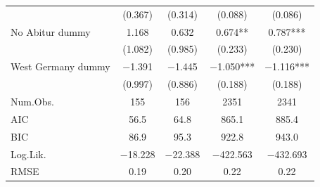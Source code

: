 \documentclass[
]{article}
\begin{document}
\begin{table}[!h]
\begin{tabular}[t]{lcccc}
 & (\num{0.367}) & (\num{0.314}) & (\num{0.088}) & (\num{0.086})\\
No Abitur dummy & \num{1.168} & \num{0.632} & \num{0.674}** & \num{0.787}***\\
 & (\num{1.082}) & (\num{0.985}) & (\num{0.233}) & (\num{0.230})\\
West Germany dummy & \num{-1.391} & \num{-1.445} & \num{-1.050}*** & \num{-1.116}***\\
 & (\num{0.997}) & (\num{0.886}) & (\num{0.188}) & (\num{0.188})\\
\midrule
Num.Obs. & \num{155} & \num{156} & \num{2351} & \num{2341}\\
AIC & \num{56.5} & \num{64.8} & \num{865.1} & \num{885.4}\\
BIC & \num{86.9} & \num{95.3} & \num{922.8} & \num{943.0}\\
Log.Lik. & \num{-18.228} & \num{-22.388} & \num{-422.563} & \num{-432.693}\\
RMSE & \num{0.19} & \num{0.20} & \num{0.22} & \num{0.22}\\
\bottomrule
\end{tabular}
\end{table}
\end{document}
